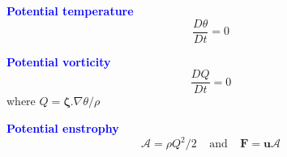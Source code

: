 \documentclass[a4]{seminar}
\newcommand{\B}[1]{\textcolor{blue}{#1}}
\begin{document}
\begin{slide}

\B{\bf Potential temperature}
\begin{displaymath}
\frac{D \theta}{Dt} = 0
\end{displaymath}

\vspace{2mm}

\B{\bf Potential vorticity}
\begin{displaymath}
\frac{DQ}{Dt} = 0
\end{displaymath}
where \( Q = \boldsymbol{\zeta}.\nabla \theta / \rho \)

\vspace{2mm}

\B{\bf Potential enstrophy}
\begin{displaymath}
\mathcal{A} = \rho Q^2 / 2 \ \ \ \ \ 
\mathrm{and} \ \ \ \ \  \mathbf{F} = \mathbf{u} \mathcal{A}
\end{displaymath}


\end{slide}



















\end{document}
